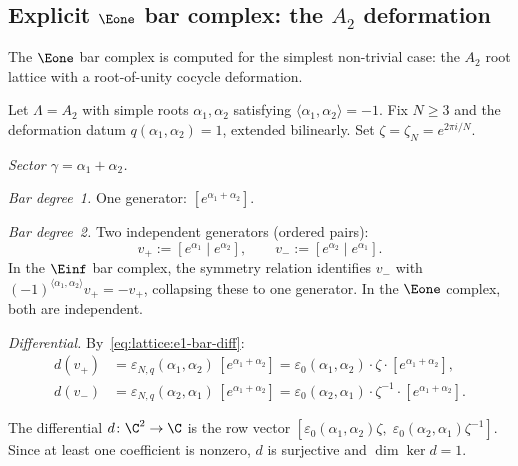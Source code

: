\subsection{Explicit $\Eone$ bar complex: the $A_2$ deformation}

The $\Eone$ bar complex is computed for the simplest
non-trivial case: the $A_2$ root lattice with a root-of-unity
cocycle deformation.

\begin{computation}
\label{comp:lattice:e1-bar-A2}
Let $\Lambda = A_2$ with simple roots $\alpha_1, \alpha_2$
satisfying $\langle\alpha_1,\alpha_2\rangle = -1$. Fix $N \geq 3$
and the deformation datum $q(\alpha_1,\alpha_2) = 1$, extended
bilinearly. Set $\zeta = \zeta_N = e^{2\pi i/N}$.

\noindent\emph{Sector $\gamma = \alpha_1 + \alpha_2$.}

\emph{Bar degree~1.} One generator: $[e^{\alpha_1+\alpha_2}]$.

\emph{Bar degree~2.} Two independent generators (ordered pairs):
\[
v_+ := [e^{\alpha_1} \mid e^{\alpha_2}],
\qquad
v_- := [e^{\alpha_2} \mid e^{\alpha_1}].
\]
In the $\Einf$ bar complex, the symmetry relation identifies
$v_-$ with $(-1)^{\langle\alpha_1,\alpha_2\rangle} v_+ = -v_+$,
collapsing these to one generator. In the $\Eone$ complex,
both are independent.

\emph{Differential.}
By~\eqref{eq:lattice:e1-bar-diff}:
\begin{align*}
d(v_+)
&= \varepsilon_{N,q}(\alpha_1, \alpha_2)\,
 [e^{\alpha_1+\alpha_2}]
 = \varepsilon_0(\alpha_1,\alpha_2) \cdot \zeta \cdot
 [e^{\alpha_1+\alpha_2}], \\
d(v_-)
&= \varepsilon_{N,q}(\alpha_2, \alpha_1)\,
 [e^{\alpha_1+\alpha_2}]
 = \varepsilon_0(\alpha_2,\alpha_1) \cdot \zeta^{-1} \cdot
 [e^{\alpha_1+\alpha_2}].
\end{align*}

The differential $d \colon \C^2 \to \C$ is the row vector
$[\varepsilon_0(\alpha_1,\alpha_2)\zeta,\;
\varepsilon_0(\alpha_2,\alpha_1)\zeta^{-1}]$.
Since at least one coefficient is nonzero, $d$ is surjective and
$\dim\ker d = 1$.


\end{computation}
